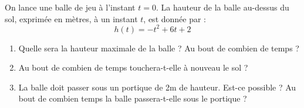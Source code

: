 
On lance une balle de jeu à l'instant $t = 0$. 
La hauteur de la balle au-dessus du sol, exprimée en mètres, à un instant $t$, est donnée par : $$ h(t)=-t^2+6t+2 $$

\begin{enumerate}
\item Quelle sera la hauteur maximale de la balle ? Au bout de combien de temps ?
\item Au bout de combien de temps touchera-t-elle à nouveau le sol ?
\item La balle doit passer sous un portique de 2m de hauteur. Est-ce possible ? Au bout de combien temps la balle passera-t-elle sous le portique ?
\end{enumerate}

